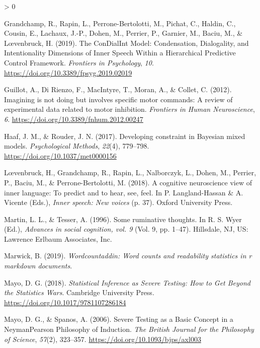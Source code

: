 \documentclass[
  english,
  man, donotrepeattitle,floatsintext]{apa6}
\newlength{\cslhangindent}
\newenvironment{CSLReferences}[2] %
 {%
  \setlength{\parindent}{0pt}
  \ifodd #1 \everypar{\setlength{\hangindent}{\cslhangindent}}\ignorespaces\fi
  \ifnum #2 > 0
  \setlength{\parskip}{#2\baselineskip}
  \fi
 }%
 {}
\begin{document}
\begin{CSLReferences}{1}{0}
\leavevmode\hypertarget{ref-grandchamp_condialint_2019}{}%
Grandchamp, R., Rapin, L., Perrone-Bertolotti, M., Pichat, C., Haldin, C., Cousin, E., Lachaux, J.-P., Dohen, M., Perrier, P., Garnier, M., Baciu, M., \& Lœvenbruck, H. (2019). The {ConDialInt Model}: {Condensation}, {Dialogality}, and {Intentionality Dimensions} of {Inner Speech Within} a {Hierarchical Predictive Control Framework}. \emph{Frontiers in Psychology}, \emph{10}. \url{https://doi.org/10.3389/fpsyg.2019.02019}

\leavevmode\hypertarget{ref-guillot_imagining_2012}{}%
Guillot, A., Di Rienzo, F., MacIntyre, T., Moran, A., \& Collet, C. (2012). Imagining is not doing but involves specific motor commands: {A} review of experimental data related to motor inhibition. \emph{Frontiers in Human Neuroscience}, \emph{6}. \url{https://doi.org/10.3389/fnhum.2012.00247}

\leavevmode\hypertarget{ref-haaf_developing_2017}{}%
Haaf, J. M., \& Rouder, J. N. (2017). Developing constraint in {Bayesian} mixed models. \emph{Psychological Methods}, \emph{22}(4), 779--798. \url{https://doi.org/10.1037/met0000156}

\leavevmode\hypertarget{ref-loevenbruck_cognitive_2018}{}%
Lœvenbruck, H., Grandchamp, R., Rapin, L., Nalborczyk, L., Dohen, M., Perrier, P., Baciu, M., \& Perrone-Bertolotti, M. (2018). A cognitive neuroscience view of inner language: To predict and to hear, see, feel. In P. Langland-Hassan \& A. Vicente (Eds.), \emph{Inner speech: {New} voices} (p. 37). {Oxford University Press}.

\leavevmode\hypertarget{ref-Martin}{}%
Martin, L. L., \& Tesser, A. (1996). Some ruminative thoughts. In R. S. Wyer (Ed.), \emph{Advances in social cognition, vol. 9} (Vol. 9, pp. 1--47). {Hillsdale, NJ, US: Lawrence Erlbaum Associates, Inc}.

\leavevmode\hypertarget{ref-R-wordcountaddin}{}%
Marwick, B. (2019). \emph{Wordcountaddin: Word counts and readability statistics in r markdown documents}.

\leavevmode\hypertarget{ref-mayo_statistical_2018}{}%
Mayo, D. G. (2018). \emph{Statistical {Inference} as {Severe Testing}: {How} to {Get Beyond} the {Statistics Wars}}. {Cambridge University Press}. \url{https://doi.org/10.1017/9781107286184}

\leavevmode\hypertarget{ref-mayo_severe_2006}{}%
Mayo, D. G., \& Spanos, A. (2006). Severe {Testing} as a {Basic Concept} in a {Neyman}{{Pearson Philosophy}} of {Induction}. \emph{The British Journal for the Philosophy of Science}, \emph{57}(2), 323--357. \url{https://doi.org/10.1093/bjps/axl003}


\end{CSLReferences}
\end{document}
